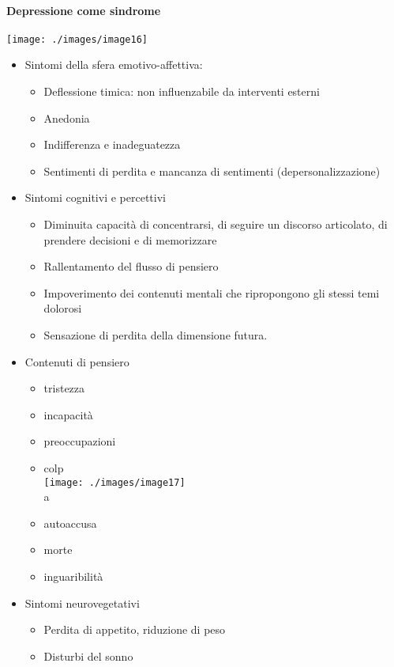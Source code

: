 {\paragraph{Depressione come sindrome} \medskip
\texttt{[image: ./images/image16]}
\medskip\\
\begin{itemize}
	\item Sintomi della sfera emotivo-affettiva:
	\begin{itemize}
		\item Deflessione timica: non influenzabile da interventi esterni
		\item Anedonia
		\item Indifferenza e inadeguatezza 
		\item Sentimenti di perdita e mancanza di sentimenti (depersonalizzazione) 
	\end{itemize}
	\item Sintomi cognitivi e percettivi
	\begin{itemize}
		\item Diminuita capacità di concentrarsi, di seguire un discorso articolato, di prendere decisioni e di memorizzare
		\item Rallentamento del flusso di pensiero 
		\item Impoverimento dei contenuti mentali che ripropongono gli stessi temi dolorosi
		\item Sensazione di perdita della dimensione futura.
	\end{itemize}
	\item Contenuti di pensiero
	\begin{itemize}
		\item tristezza 
		\item incapacità 
		\item preoccupazioni
		\item colp\medskip\\
			\texttt{[image: ./images/image17]}
			\medskip\\a
		\item autoaccusa
		\item morte
		\item inguaribilità 
		\end{itemize}
	\item Sintomi neurovegetativi
	\begin{itemize}
		\item Perdita di appetito, riduzione di peso
		\item Disturbi del sonno

\end{itemize}
\end{itemize}}
